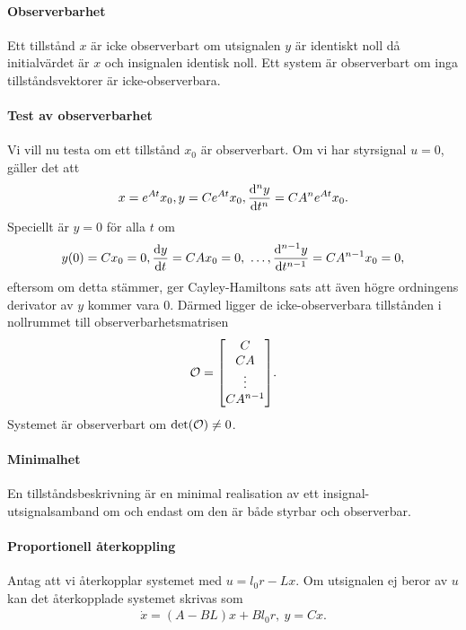 \paragraph{Observerbarhet}
Ett tillstånd $x$ är icke observerbart om utsignalen $y$ är identiskt noll då initialvärdet är $x$ och insignalen identisk noll. Ett system är observerbart om inga tillståndsvektorer är icke-observerbara.

\paragraph{Test av observerbarhet}
Vi vill nu testa om ett tillstånd $x_{0}$ är observerbart. Om vi har styrsignal $u = 0$, gäller det att
\begin{align*}
	x = e^{At}x_{0}, y = Ce^{At}x_{0}, \dv[n]{y}{t} = CA^{n}e^{At}x_{0}.
\end{align*}
Speciellt är $y = 0$ för alla $t$ om
\begin{align*}
	y(0) = Cx_{0} = 0, \dv{y}{t} = CAx_{0} = 0,\ \dots, \dv[n - 1]{y}{t} = CA^{n - 1}x_{0} = 0,
\end{align*}
eftersom om detta stämmer, ger Cayley-Hamiltons sats att även högre ordningens derivator av $y$ kommer vara $0$. Därmed ligger de icke-observerbara tillstånden i nollrummet till observerbarhetsmatrisen
\begin{align*}
	\O =
	\mqty[
		C \\
		CA \\
		\vdots \\
		CA^{n - 1}
	].
\end{align*}
Systemet är observerbart om $\det(\mathcal{O}) \neq 0$.

\paragraph{Minimalhet}
En tillståndsbeskrivning är en minimal realisation av ett insignal-utsignalsamband om och endast om den är både styrbar och observerbar.

\paragraph{Proportionell återkoppling}
Antag att vi återkopplar systemet med $u = l_{0}r - Lx$. Om utsignalen ej beror av $u$ kan det återkopplade systemet skrivas som
\begin{align*}
	\dot{x} = (A - BL)x + Bl_{0}r,\ y = Cx.
\end{align*}

